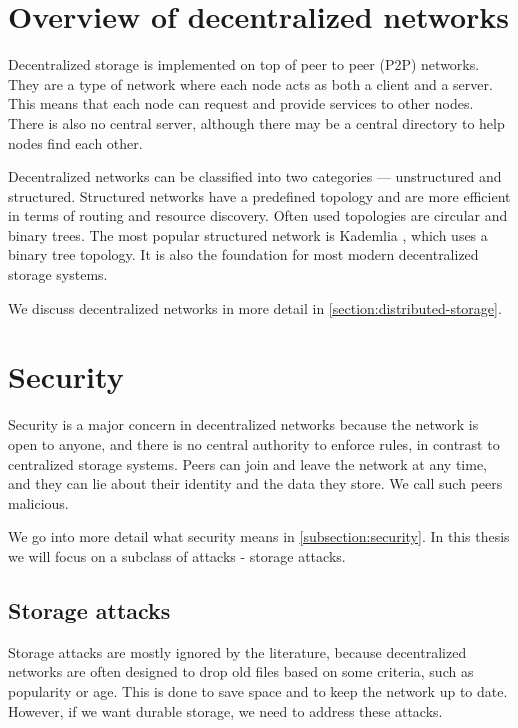 \section{Overview of decentralized networks}

Decentralized storage is implemented on top of peer to peer (P2P) networks.
They are a type of network where each node acts as both a client and a server.
This means that each node can request and provide services to other nodes.
There is also no central server, although there may be a central directory to help nodes find each other.

Decentralized networks can be classified into two categories --- unstructured and structured.
Structured networks have a predefined topology and are more efficient in terms of routing and resource discovery.
Often used topologies are circular and binary trees.
The most popular structured network is Kademlia \cite{kademlia}, which uses a binary tree topology.
It is also the foundation for most modern decentralized storage systems.

We discuss decentralized networks in more detail in \ref{section:distributed-storage}.

\section{Security}

Security is a major concern in decentralized networks because
the network is open to anyone, and there is no central authority to enforce rules,
in contrast to centralized storage systems.
Peers can join and leave the network at any time, and they can lie about their identity and the data they store.
We call such peers malicious.

We go into more detail what security means in \ref{subsection:security}.
In this thesis we will focus on a subclass of attacks - storage attacks.

\subsection{Storage attacks}
\label{section:storage-attacks}

Storage attacks are mostly ignored by the literature, because decentralized networks are often designed to
drop old files based on some criteria, such as popularity or age.
This is done to save space and to keep the network up to date.
However, if we want durable storage, we need to address these attacks.

